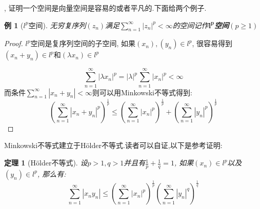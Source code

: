 \documentclass[a4paper,11pt]{book}
\newtheorem{theorem}{\hspace{2em}定理}[section]
\newtheorem{proof}{证明}[section]
\newtheorem{example}{例}[section]
\begin{document}
, 证明一个空间是向量空间是容易的或者平凡的.下面给两个例子.
\begin{example}[$l^p$空间]
  无穷复序列$(z_n)$满足$\sum_{n=1}^{\infty}|z_n|^p<\infty$的空间记作\textbf{$\mathbf{l^p}$空间}$(p\geq1)$
\end{example}
\begin{proof}
  \indent$l^p$空间是复序列空间的子空间, 如果$(x_n),(y_n)\in l^p$, 很容易得到$(x_n+y_n)\in l^p$和$(\lambda x_n)\in l^p$

  \begin{equation*}
    \sum_{n=1}^\infty|\lambda x_n|^p=|\lambda|^p\sum_{n=1}^{\infty}|x_n|^p<\infty
  \end{equation*}
而条件$\sum_{n=1}^{\infty}|x_n+y_n|<\infty$则可以用Minkowski不等式得到:
\begin{equation*}
  (\sum_{n=1}^{\infty}|x_n+y_n|^p)^{\frac{1}{p}}\leq(\sum_{n=1}^{\infty}|x_n|^p)^{\frac{1}{p}}+(\sum_{n=1}^{\infty}|y_n|^p)^{\frac{1}{p}}
\end{equation*}
\end{proof}
Minkowski不等式建立于H\"{o}lder不等式.读者可以自证,以下是参考证明:
\begin{theorem}[H\"{o}lder不等式]
  设$p>1,q>1$并且有$\frac{1}{p}+\frac{1}{q}=1$, 如果$(x_n)\in l^p$以及$(y_n)\in l^p$, 那么有:
  \begin{equation*}
    \sum_{n=1}^{\infty}|x_ny_n|\leq(\sum_{n=1}^{\infty}|x_n|^p)^{\frac{1}{p}}(\sum_{n=1}^{\infty}|y_n|^q)^{\frac{1}{q}}
  \end{equation*}
\end{theorem}
\end{document}
